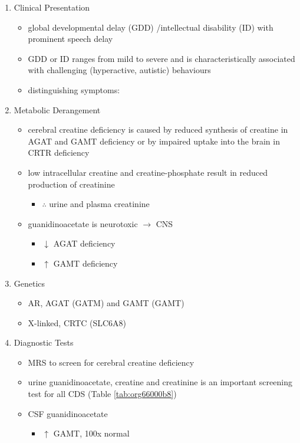 \documentclass{scrartcl}
\begin{document}
\begin{enumerate}
\item Clinical Presentation
\label{sec:org4eb41cf}
\begin{itemize}
\item global developmental delay (GDD) /intellectual disability (ID) with
prominent speech delay
\item GDD or ID ranges from mild to severe and is characteristically
associated with challenging (hyperactive, autistic) behaviours
\item distinguishing symptoms:
\end{itemize}

\item Metabolic Derangement
\label{sec:orgebfc315}
\begin{itemize}
\item cerebral creatine deficiency is caused by reduced synthesis of
creatine in AGAT and GAMT deficiency or by impaired uptake into the
brain in CRTR deficiency
\item low intracellular creatine and creatine-phosphate result in reduced
production of creatinine
\begin{itemize}
\item \(\therefore\) \low urine and plasma creatinine
\end{itemize}
\item guanidinoacetate is neurotoxic \(\to\) CNS
\begin{itemize}
\item \(\downarrow\) AGAT deficiency
\item \(\uparrow\) GAMT deficiency
\end{itemize}
\end{itemize}

\item Genetics
\label{sec:orga17e87d}
\begin{itemize}
\item AR, AGAT (GATM) and GAMT (GAMT)
\item X-linked, CRTC (SLC6A8)
\end{itemize}
\item Diagnostic Tests
\label{sec:orge8eed32}
\begin{itemize}
\item MRS to screen for cerebral creatine deficiency
\item urine guanidinoacetate, creatine and creatinine is an important
screening test for all CDS (Table \ref{tab:org66000b8})
\item CSF guanidinoacetate
\begin{itemize}
\item \(\uparrow\) GAMT, 100x normal
\end{itemize}
\end{itemize}




\end{enumerate}
\end{document}
